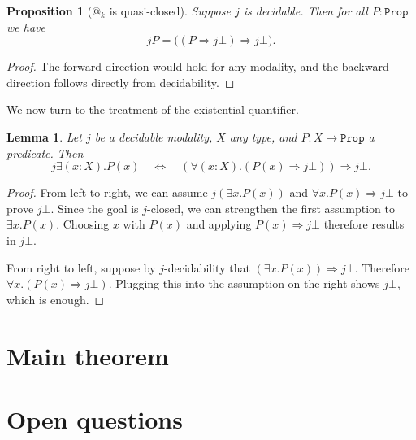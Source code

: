 \documentclass[11pt, oneside, article]{memoir}
\makeatletter
\theoremstyle{plain}
\newtheorem{proposition}[theorem]{Proposition}
\newtheorem{lemma}[theorem]{Lemma}
\theoremstyle{definition}
\theoremstyle{remark}
\newcommand{\const}[1]{\mathtt{#1}}
\newcommand{\prop}{\const{Prop}}
\newcommand{\pt}{k}				%
\newcommand{\AtSymbol}{{@}}
\newcommand{\At}[1][\pt]{\AtSymbol_{#1}}
\newcommand{\imp}{\Rightarrow}
\makeatother
\begin{document}
\begin{proposition}[$\At$ is quasi-closed]
Suppose $j$ is decidable. Then for all $P:\prop$ we have
\[j P=\big((P\imp j\bot)\imp j\bot\big).\]
\end{proposition}
\begin{proof}
The forward direction would hold for any modality, and the backward direction follows directly from decidability.
\end{proof}

We now turn to the treatment of the existential quantifier.

\begin{lemma}%
	Let $j$ be a decidable modality, $X$ any type, and $P : X \to \prop$ a predicate. Then
	\[
		j \exists (x : X) . P(x) \quad \Longleftrightarrow \quad \left( \forall (x : X). (P(x) \imp j \bot) \right) \imp j \bot.
	\]
\end{lemma}

\begin{proof}
	From left to right, we can assume $j \left( \exists x. P(x)\right)$ and $\forall x. P(x) \imp j\bot$ to prove $j\bot$. Since the goal is $j$-closed, we can strengthen the first assumption to $\exists x. P(x)$. Choosing $x$ with $P(x)$ and applying $P(x) \imp j\bot$ therefore results in $j\bot$.

	From right to left, suppose by $j$-decidability that $\left( \exists x. P(x) \right) \imp j\bot$. Therefore $\forall x. (P(x) \imp j\bot)$. Plugging this into the assumption on the right shows $j\bot$, which is enough.
\end{proof}



\chapter{Main theorem}

\chapter{Open questions}
\end{document}
